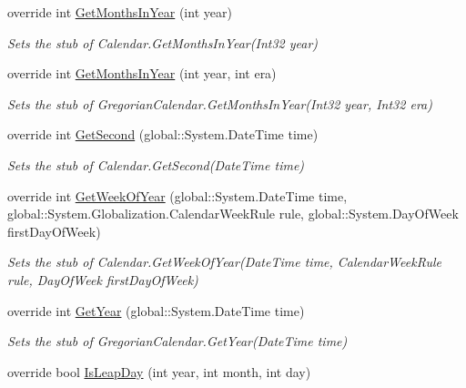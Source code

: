 \begin{DoxyCompactItemize}
override int \hyperlink{class_system_1_1_globalization_1_1_fakes_1_1_stub_gregorian_calendar_a76be76db09ddf8acf4ac432bfffb0a6a}{Get\-Months\-In\-Year} (int year)
\begin{DoxyCompactList}\small\item\em Sets the stub of Calendar.\-Get\-Months\-In\-Year(\-Int32 year)\end{DoxyCompactList}\item 
override int \hyperlink{class_system_1_1_globalization_1_1_fakes_1_1_stub_gregorian_calendar_a88c5d3bc9070bdcb14a8877f08cb23fc}{Get\-Months\-In\-Year} (int year, int era)
\begin{DoxyCompactList}\small\item\em Sets the stub of Gregorian\-Calendar.\-Get\-Months\-In\-Year(\-Int32 year, Int32 era)\end{DoxyCompactList}\item 
override int \hyperlink{class_system_1_1_globalization_1_1_fakes_1_1_stub_gregorian_calendar_a6ad217c5518e15ed809f9a82e5231d3e}{Get\-Second} (global\-::\-System.\-Date\-Time time)
\begin{DoxyCompactList}\small\item\em Sets the stub of Calendar.\-Get\-Second(\-Date\-Time time)\end{DoxyCompactList}\item 
override int \hyperlink{class_system_1_1_globalization_1_1_fakes_1_1_stub_gregorian_calendar_a7002f51fc4ba03526532c83e315b0ca7}{Get\-Week\-Of\-Year} (global\-::\-System.\-Date\-Time time, global\-::\-System.\-Globalization.\-Calendar\-Week\-Rule rule, global\-::\-System.\-Day\-Of\-Week first\-Day\-Of\-Week)
\begin{DoxyCompactList}\small\item\em Sets the stub of Calendar.\-Get\-Week\-Of\-Year(\-Date\-Time time, Calendar\-Week\-Rule rule, Day\-Of\-Week first\-Day\-Of\-Week)\end{DoxyCompactList}\item 
override int \hyperlink{class_system_1_1_globalization_1_1_fakes_1_1_stub_gregorian_calendar_a21130f02e61f880e7b5f6929dd4e3e55}{Get\-Year} (global\-::\-System.\-Date\-Time time)
\begin{DoxyCompactList}\small\item\em Sets the stub of Gregorian\-Calendar.\-Get\-Year(\-Date\-Time time)\end{DoxyCompactList}\item 
override bool \hyperlink{class_system_1_1_globalization_1_1_fakes_1_1_stub_gregorian_calendar_a411ab06f73824ba11010a3eb9ef465ec}{Is\-Leap\-Day} (int year, int month, int day)

\end{DoxyCompactItemize}
